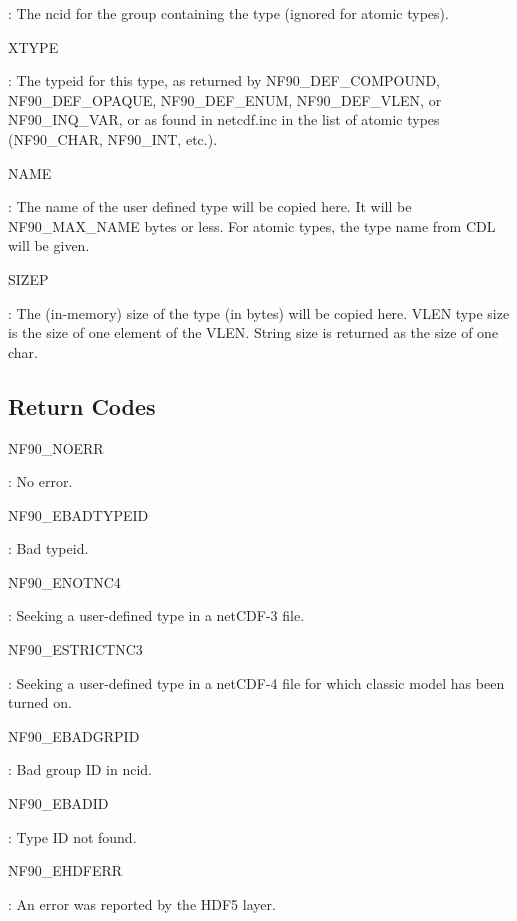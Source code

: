 \+: The ncid for the group containing the type (ignored for atomic types).

{\ttfamily X\+T\+Y\+PE}

\+: The typeid for this type, as returned by N\+F90\+\_\+\+D\+E\+F\+\_\+\+C\+O\+M\+P\+O\+U\+ND, N\+F90\+\_\+\+D\+E\+F\+\_\+\+O\+P\+A\+Q\+UE, N\+F90\+\_\+\+D\+E\+F\+\_\+\+E\+N\+UM, N\+F90\+\_\+\+D\+E\+F\+\_\+\+V\+L\+EN, or N\+F90\+\_\+\+I\+N\+Q\+\_\+\+V\+AR, or as found in netcdf.\+inc in the list of atomic types (N\+F90\+\_\+\+C\+H\+AR, N\+F90\+\_\+\+I\+NT, etc.).

{\ttfamily N\+A\+ME}

\+: The name of the user defined type will be copied here. It will be N\+F90\+\_\+\+M\+A\+X\+\_\+\+N\+A\+ME bytes or less. For atomic types, the type name from C\+DL will be given.

{\ttfamily S\+I\+Z\+EP}

\+: The (in-\/memory) size of the type (in bytes) will be copied here. V\+L\+EN type size is the size of one element of the V\+L\+EN. String size is returned as the size of one char.

\subsection*{Return Codes}

{\ttfamily N\+F90\+\_\+\+N\+O\+E\+RR}

\+: No error.

{\ttfamily N\+F90\+\_\+\+E\+B\+A\+D\+T\+Y\+P\+E\+ID}

\+: Bad typeid.

{\ttfamily N\+F90\+\_\+\+E\+N\+O\+T\+N\+C4}

\+: Seeking a user-\/defined type in a net\+C\+D\+F-\/3 file.

{\ttfamily N\+F90\+\_\+\+E\+S\+T\+R\+I\+C\+T\+N\+C3}

\+: Seeking a user-\/defined type in a net\+C\+D\+F-\/4 file for which classic model has been turned on.

{\ttfamily N\+F90\+\_\+\+E\+B\+A\+D\+G\+R\+P\+ID}

\+: Bad group ID in ncid.

{\ttfamily N\+F90\+\_\+\+E\+B\+A\+D\+ID}

\+: Type ID not found.

{\ttfamily N\+F90\+\_\+\+E\+H\+D\+F\+E\+RR}

\+: An error was reported by the H\+D\+F5 layer.

